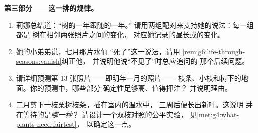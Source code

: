\begin{problem}
\medskip\noindent\textbf{第三部分——这一排的规律。}
\begin{enumerate}[resume]
  \item 莉娜总结道：“树的一年跟随的一年。”
        请用两组配对来支持她的说法：每一组都是
        树在相邻两张照片之间的变化，
        对应她记录的昼长或的变化。
  \item 她的小弟弟说，七月那片水仙
        “死了”这一说法，请用
        \cref{rem:g6:life-through-seasons:vanish}纠正他，
        并说明他说“不见了”时总应追问的
        那个后续问题。
  \item 请详细预测第 13 张照片——即明年一月的照片——
        枝条、小枝和树下的地面。你的预测中，哪些部分
        确定性足够高、值得押注？
        并说明理由。
  \item 二月剪下一枝栗树枝条，插在室内的温水中，
        三周后便长出新叶。这说明
        芽在等待的是\emph{哪一种}？
        请设计一个双枝对照的公平实验，
        见\cref{met:g4:what-plants-need:fairtest}，
        以确定这一点。
\end{enumerate}
\end{problem}
